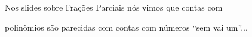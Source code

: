 \documentclass[oneside,12pt]{article}
\begin{document}
\newpage


Nos slides sobre Frações Parciais nós vimos que contas com

polinômios são parecidas com contas com números ``sem vai um''...




\end{document}
